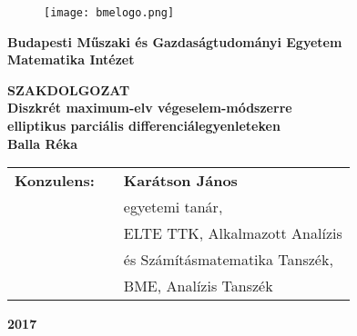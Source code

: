 \begin{center}


\begin{figure}[t]
\centerline{\texttt{[image: bmelogo.png]}}
\end{figure}
\textbf{\small{Budapesti Műszaki és Gazdaságtudományi Egyetem\\Matematika Intézet}\\}
\vspace{2cm}

\textbf{\Large {SZAKDOLGOZAT\\}}
\vspace{1 cm}
 \textbf{\Large{Diszkrét maximum-elv végeselem-módszerre\\elliptikus parciális differenciálegyenleteken\\}}
  \vspace{1cm}														
  \textbf{\Large{Balla Réka}\\}
\vspace{3cm}

\begin{tabular}{rcl}  
\textbf{\large{Konzulens:}} & \hspace{1 cm} & \textbf{\large{Karátson János}}\\
  &   & \large{egyetemi tanár,}\\
  &   & \normalsize{ELTE TTK, Alkalmazott Analízis}\\
  &   & \normalsize{és Számításmatematika Tanszék,}\\  
  &   & \normalsize{BME, Analízis Tanszék}
\end{tabular}
 

 
 \vspace{2 cm}
\textbf{\Large{2017}}

\end{center}